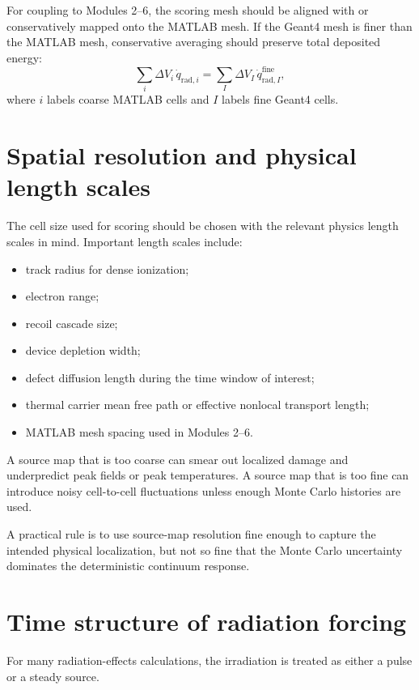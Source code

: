 \documentclass[11pt]{article}
\begin{document}
For coupling to Modules 2--6, the scoring mesh should be aligned with or conservatively mapped onto the MATLAB mesh. If the Geant4 mesh is finer than the MATLAB mesh, conservative averaging should preserve total deposited energy:
\begin{equation}
\sum_i \Delta V_i\,\dot{q}_{\mathrm{rad},i}
=
\sum_I \Delta V_I\,\dot{q}_{\mathrm{rad},I}^{\mathrm{fine}},
\end{equation}
where $i$ labels coarse MATLAB cells and $I$ labels fine Geant4 cells.

\section{Spatial resolution and physical length scales}

The cell size used for scoring should be chosen with the relevant physics length scales in mind. Important length scales include:
\begin{itemize}
\item track radius for dense ionization;
\item electron range;
\item recoil cascade size;
\item device depletion width;
\item defect diffusion length during the time window of interest;
\item thermal carrier mean free path or effective nonlocal transport length;
\item MATLAB mesh spacing used in Modules 2--6.
\end{itemize}

A source map that is too coarse can smear out localized damage and underpredict peak fields or peak temperatures. A source map that is too fine can introduce noisy cell-to-cell fluctuations unless enough Monte Carlo histories are used.

A practical rule is to use source-map resolution fine enough to capture the intended physical localization, but not so fine that the Monte Carlo uncertainty dominates the deterministic continuum response.

\section{Time structure of radiation forcing}

For many radiation-effects calculations, the irradiation is treated as either a pulse or a steady source.
\end{document}

